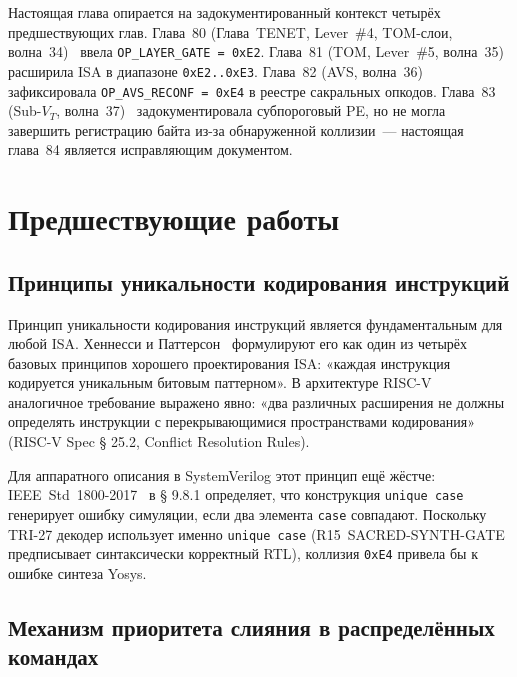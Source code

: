 Настоящая глава опирается на задокументированный контекст четырёх
предшествующих глав.  Глава~80 (Глава~TENET, Lever~\#4, TOM-слои,
волна~34)~\cite{glava80_tenet} ввела \texttt{OP\_LAYER\_GATE = 0xE2}.
Глава~81 (TOM, Lever~\#5, волна~35)~\cite{glava81_tom} расширила ISA
в диапазоне \texttt{0xE2..0xE3}.  Глава~82 (AVS, волна~36)~\cite{glava82_avs}
зафиксировала \texttt{OP\_AVS\_RECONF = 0xE4} в реестре сакральных
опкодов.  Глава~83 (Sub-$V_T$, волна~37)~\cite{glava83_subvt}
задокументировала субпороговый PE, но не могла завершить регистрацию
байта из-за обнаруженной коллизии~— настоящая глава~84 является
исправляющим документом.

\section{Предшествующие работы}
\label{sec:prior_work}

\subsection{Принципы уникальности кодирования инструкций}

Принцип уникальности кодирования инструкций является фундаментальным
для любой ISA.  Хеннесси и Паттерсон~\cite{hennessy_patterson_5ed}
формулируют его как один из четырёх базовых принципов хорошего
проектирования ISA: «каждая инструкция кодируется уникальным
битовым паттерном».  В архитектуре RISC-V~\cite{riscv_spec_2019}
аналогичное требование выражено явно: «два различных расширения
не должны определять инструкции с перекрывающимися пространствами
кодирования» (RISC-V Spec § 25.2, Conflict Resolution Rules).

Для аппаратного описания в SystemVerilog этот принцип ещё жёстче:
IEEE~Std~1800-2017~\cite{ieee_sv_2017} в § 9.8.1 определяет, что
конструкция \texttt{unique~case} генерирует ошибку симуляции, если
два элемента \texttt{case} совпадают.  Поскольку TRI-27 декодер
использует именно \texttt{unique~case} (R15~SACRED-SYNTH-GATE
предписывает синтаксически корректный RTL), коллизия \texttt{0xE4}
привела бы к ошибке синтеза Yosys.

\subsection{Механизм приоритета слияния в распределённых командах}

